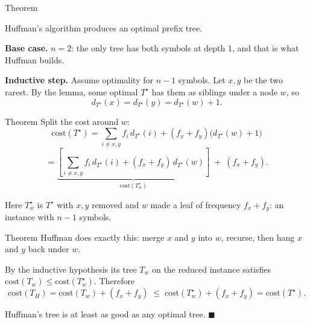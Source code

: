 \documentclass[10pt,aspectratio=169]{beamer}
\begin{document}
\begin{frame}{Theorem}
  \begin{block}{}
    Huffman's algorithm produces an optimal prefix tree.
  \end{block}

  \bigskip
  \textbf{Base case.} $n = 2$: the only tree has both symbols at depth $1$,
  and that is what Huffman builds.

  \bigskip
  \textbf{Inductive step.} Assume optimality for $n-1$ symbols. Let $x, y$ be
  the two rarest. By the lemma, some optimal $T^\star$ has them as siblings
  under a node $w$, so
  \[
    d_{T^\star}(x) = d_{T^\star}(y) = d_{T^\star}(w) + 1.
  \]
\end{frame}

\begin{frame}{Theorem}
  Split the cost around $w$:
  \[
    \text{cost}(T^\star)
    = \sum_{i \ne x,y} f_i\, d_{T^\star}(i) + (f_x + f_y)\big(d_{T^\star}(w) + 1\big)
  \]
  \[
    = \underbrace{\left[ \sum_{i \ne x,y} f_i\, d_{T^\star}(i)
      + (f_x + f_y)\, d_{T^\star}(w) \right]}_{\text{cost}(T^\star_w)}
      \;+\; (f_x + f_y).
  \]

  \bigskip
  Here $T^\star_w$ is $T^\star$ with $x, y$ removed and $w$ made a leaf of
  frequency $f_x + f_y$: an instance with $n-1$ symbols.
\end{frame}

\begin{frame}{Theorem}
  Huffman does exactly this: merge $x$ and $y$ into $w$, recurse, then hang
  $x$ and $y$ back under $w$.

  \bigskip
  By the inductive hypothesis its tree $T_w$ on the reduced instance satisfies
  $\text{cost}(T_w) \le \text{cost}(T^\star_w)$. Therefore
  \[
    \text{cost}(T_H) = \text{cost}(T_w) + (f_x + f_y)
    \;\le\; \text{cost}(T^\star_w) + (f_x + f_y)
    = \text{cost}(T^\star).
  \]

  \bigskip
  \begin{center}
    Huffman's tree is at least as good as any optimal tree. $\blacksquare$
  \end{center}
\end{frame}
\end{document}
